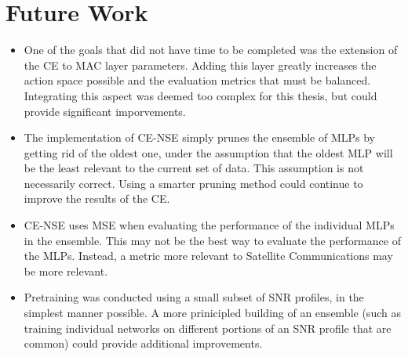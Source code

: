 \section{Future Work}
\begin{itemize}
\item One of the goals that did not have time to be completed was the extension of the CE to MAC layer parameters.  Adding this layer greatly increases the action space possible and the evaluation metrics that must be balanced. Integrating this aspect was deemed too complex for this thesis, but could provide significant imporvements.
\item The implementation of CE-NSE simply prunes the ensemble of MLPs by getting rid of the oldest one, under the assumption that the oldest MLP will be the least relevant to the current set of data. This assumption is not necessarily correct. Using a smarter pruning method could continue to improve the results of the CE.
\item CE-NSE uses MSE when evaluating the performance of the individual MLPs in the ensemble. This may not be the best way to evaluate the performance of the MLPs. Instead, a metric more relevant to Satellite Communications may be more relevant.
\item Pretraining was conducted using a small subset of SNR profiles, in the simplest manner possible. A more prinicipled building of an ensemble (such as training individual networks on different portions of an SNR profile that are common) could provide additional improvements.
\end{itemize}